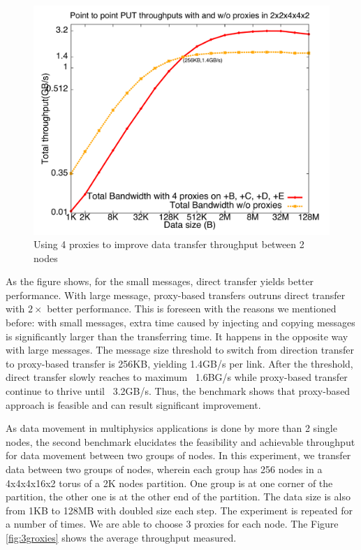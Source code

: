 \begin{figure}[!htb]
\vspace{-0.1in}
\centering
\includegraphics[scale=0.3]{figures/4proxies}
\vspace{-0.2in}
\caption{Using 4 proxies to improve data transfer throughput between 2 nodes}
\vspace{-0.1in}
\label{fig:4proxies}
\end{figure}

As the figure shows, for the small messages, direct transfer yields better performance. With large message, proxy-based transfers outruns direct transfer with $2\times$ better performance. This is foreseen with the reasons we mentioned before: with small messages, extra time caused by injecting and copying messages is significantly larger than the transferring time. It happens in the opposite way with large messages. The message size threshold to switch from direction transfer to proxy-based transfer is 256KB, yielding 1.4GB/s per link. After the threshold, direct transfer slowly reaches to maximum ~1.6BG/s while proxy-based transfer continue to thrive until ~3.2GB/s. Thus, the benchmark shows that proxy-based approach is feasible and can result significant improvement.

As data movement in multiphysics applications is done by more than 2 single nodes, the second benchmark elucidates the feasibility and achievable throughput for data movement between two groups of nodes. In this experiment, we transfer data between two groups of nodes, wherein each group has 256 nodes in a 4x4x4x16x2 torus of a 2K nodes partition. One group is at one corner of the partition, the other one is at the other end of the partition. The data size is also from 1KB to 128MB with doubled size each step. The experiment is repeated for a number of times. We are able to choose 3 proxies for each node. The Figure \ref{fig:3groxies} shows the average throughput measured.

